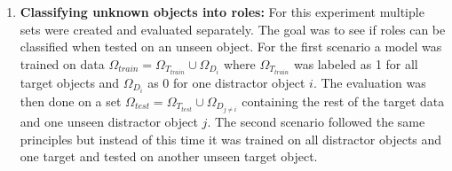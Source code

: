 \begin{enumerate}
	\item \textbf{Classifying unknown objects into roles:} For this experiment multiple sets were created and evaluated separately. The goal was to see if roles can be classified when tested on an unseen object. For the first scenario a model was trained on data $ \Omega_{train} = \Omega_{T_{train}} \cup \Omega_{D_{i}} $ where $ \Omega_{T_{train}} $ was labeled as 1 for all target objects and $ \Omega_{D_{i}} $ as 0 for one distractor object $ i $. The evaluation was then done on a set $ \Omega_{test} = \Omega_{T_{test}} \cup \Omega_{D_{j \neq i}} $ containing the rest of the target data and one unseen distractor object $ j $. The second scenario followed the same principles but instead of this time it was trained on all distractor objects and one target and tested on another unseen target object.
\end{enumerate}  

